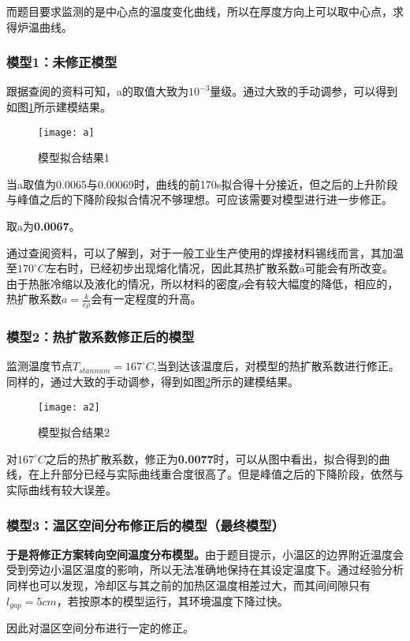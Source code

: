 \documentclass[withoutpreface,bwprint]{cumcmthesis} %
\begin{document}
而题目要求监测的是中心点的温度变化曲线，所以在厚度方向上可以取中心点，求得炉温曲线。
\subsubsection{模型1：未修正模型}
跟据查阅的资料可知，a的取值大致为$10^{-3}$量级。通过大致的手动调参，可以得到如图\ref{fig:a}所示建模结果。
\begin{figure}[!h]
	\centering
	\texttt{[image: a]}
	\caption{模型拟合结果1}
	\label{fig:a}
\end{figure}

当a取值为0.0065与0.00069时，曲线的前170s拟合得十分接近，但之后的上升阶段与峰值之后的下降阶段拟合情况不够理想。可应该需要对模型进行进一步修正。

取a为\textbf{0.0067}。

通过查阅资料，可以了解到，对于一般工业生产使用的焊接材料锡线而言，其加温至$170^{\circ}C$左右时，已经初步出现熔化情况，因此其热扩散系数a可能会有所改变。由于热胀冷缩以及液化的情况，所以材料的密度$\rho$会有较大幅度的降低，相应的，热扩散系数$a = \frac{k}{c\rho}$会有一定程度的升高。

\subsubsection{模型2：热扩散系数修正后的模型}
监测温度节点$T_{stannum}=167^{\circ}C$,当到达该温度后，对模型的热扩散系数进行修正。同样的，通过大致的手动调参，得到如图\ref{fig:a2}所示的建模结果。
\begin{figure}[!h]
	\centering
	\texttt{[image: a2]}
	\caption{模型拟合结果2}
	\label{fig:a2}
\end{figure}

对$167^{\circ}C$之后的热扩散系数，修正为\textbf{0.0077}时，可以从图中看出，拟合得到的曲线，在上升部分已经与实际曲线重合度很高了。但是峰值之后的下降阶段，依然与实际曲线有较大误差。

\subsubsection{模型3：温区空间分布修正后的模型（最终模型）}
\textbf{于是将修正方案转向空间温度分布模型。}由于题目提示，小温区的边界附近温度会受到旁边小温区温度的影响，所以无法准确地保持在其设定温度下。通过经验分析同样也可以发现，冷却区与其之前的加热区温度相差过大，而其间间隙只有$l_{gap}=5cm$，若按原本的模型运行，其环境温度下降过快。

因此对温区空间分布进行一定的修正。
\end{document}
